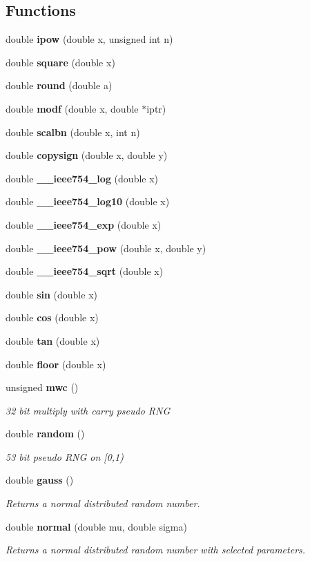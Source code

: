 \subsection*{Functions}
\begin{CompactItemize}
\item 
double {\bf ipow} (double x, unsigned int n)
\item 
double {\bf square} (double x)
\item 
double {\bf round} (double a)
\item 
double {\bf modf} (double x, double $\ast$iptr)
\item 
double {\bf scalbn} (double x, int n)
\item 
double {\bf copysign} (double x, double y)
\item 
double {\bf \_\-\_\-ieee754\_\-log} (double x)
\item 
double {\bf \_\-\_\-ieee754\_\-log10} (double x)
\item 
double {\bf \_\-\_\-ieee754\_\-exp} (double x)
\item 
double {\bf \_\-\_\-ieee754\_\-pow} (double x, double y)
\item 
double {\bf \_\-\_\-ieee754\_\-sqrt} (double x)
\item 
double {\bf sin} (double x)
\item 
double {\bf cos} (double x)
\item 
double {\bf tan} (double x)
\item 
double {\bf floor} (double x)
\item 
unsigned {\bf mwc} ()
\begin{CompactList}\small\item\em 32 bit multiply with carry pseudo RNG\item\end{CompactList}\item 
double {\bf random} ()
\begin{CompactList}\small\item\em 53 bit pseudo RNG on [0,1)\item\end{CompactList}\item 
double {\bf gauss} ()
\begin{CompactList}\small\item\em Returns a normal distributed random number.\item\end{CompactList}\item 
double {\bf normal} (double mu, double sigma)
\begin{CompactList}\small\item\em Returns a normal distributed random number with selected parameters.\item\end{CompactList}\end{CompactItemize}


